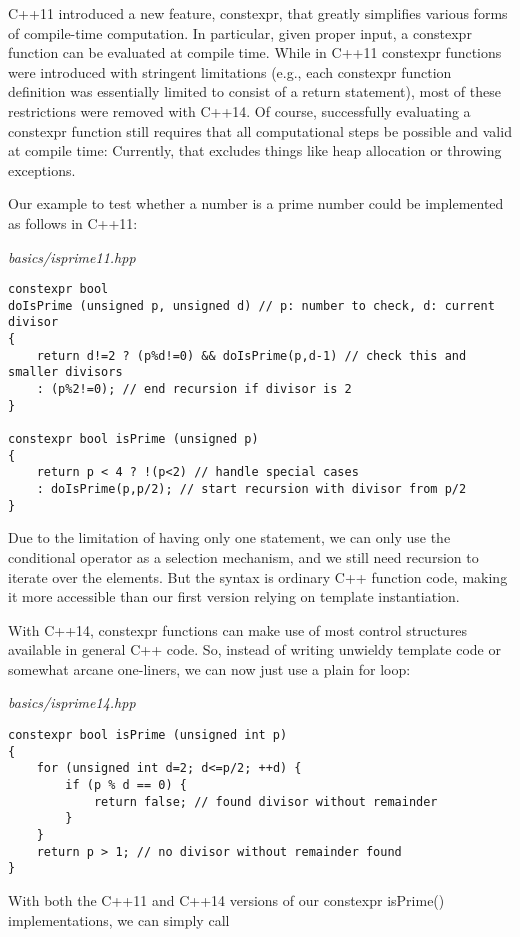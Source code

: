 C++11 introduced a new feature, constexpr, that greatly simplifies various forms of compile-time computation. In particular, given proper input, a constexpr function can be evaluated at compile time. While in C++11 constexpr functions were introduced with stringent limitations (e.g., each constexpr function definition was essentially limited to consist of a return statement), most of these restrictions were removed with C++14. Of course, successfully evaluating a constexpr function still requires that all computational steps be possible and valid at compile time: Currently, that excludes things like heap allocation or throwing exceptions.

Our example to test whether a number is a prime number could be implemented as follows in C++11:

\noindent
\textit{basics/isprime11.hpp}
\begin{lstlisting}[style=styleCXX]
constexpr bool
doIsPrime (unsigned p, unsigned d) // p: number to check, d: current divisor
{
	return d!=2 ? (p%d!=0) && doIsPrime(p,d-1) // check this and smaller divisors
	: (p%2!=0); // end recursion if divisor is 2
}

constexpr bool isPrime (unsigned p)
{
	return p < 4 ? !(p<2) // handle special cases
	: doIsPrime(p,p/2); // start recursion with divisor from p/2
}
\end{lstlisting}

Due to the limitation of having only one statement, we can only use the conditional operator as a selection mechanism, and we still need recursion to iterate over the elements. But the syntax is ordinary C++ function code, making it more accessible than our first version relying on template instantiation.

With C++14, constexpr functions can make use of most control structures available in general C++ code. So, instead of writing unwieldy template code or somewhat arcane one-liners, we can now just use a plain for loop:

\noindent
\textit{basics/isprime14.hpp}
\begin{lstlisting}[style=styleCXX]
constexpr bool isPrime (unsigned int p)
{
	for (unsigned int d=2; d<=p/2; ++d) {
		if (p % d == 0) {
			return false; // found divisor without remainder
		}
	}
	return p > 1; // no divisor without remainder found
}
\end{lstlisting}

With both the C++11 and C++14 versions of our constexpr isPrime() implementations, we can simply call

